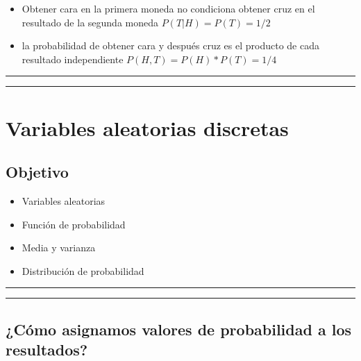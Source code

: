 \documentclass[
]{book}
\providecommand{\tightlist}{%
  \setlength{\itemsep}{0pt}\setlength{\parskip}{0pt}}
\begin{document}
\begin{itemize}
\tightlist
\item
  Obtener cara en la primera moneda no condiciona obtener cruz en el resultado de la segunda moneda \(P(T|H)=P(T)=1/2\)
\item
  la probabilidad de obtener cara y después cruz es el producto de cada resultado independiente \(P(H, T)=P(H)*P(T)=1/4\)
\end{itemize}

\begin{center}\rule{0.5\linewidth}{0.5pt}\end{center}

\begin{center}\rule{0.5\linewidth}{0.5pt}\end{center}

\hypertarget{variables-aleatorias-discretas}{%
\chapter{Variables aleatorias discretas}\label{variables-aleatorias-discretas}}

\hypertarget{objetivo-4}{%
\section{Objetivo}\label{objetivo-4}}

\begin{itemize}
\tightlist
\item
  Variables aleatorias
\item
  Función de probabilidad
\item
  Media y varianza
\item
  Distribución de probabilidad
\end{itemize}

\begin{center}\rule{0.5\linewidth}{0.5pt}\end{center}

\begin{center}\rule{0.5\linewidth}{0.5pt}\end{center}

\hypertarget{cuxf3mo-asignamos-valores-de-probabilidad-a-los-resultados}{%
\section{¿Cómo asignamos valores de probabilidad a los resultados?}\label{cuxf3mo-asignamos-valores-de-probabilidad-a-los-resultados}}
\end{document}
